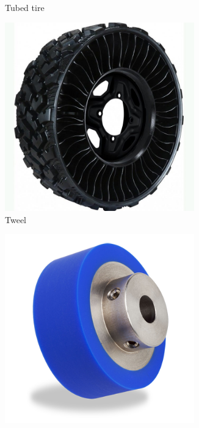 \begin{figure}[H]
\begin{subfigure}[b]{.19\linewidth}
			\caption{Tubed tire}
		\end{subfigure}\begin{subfigure}[b]{.19\linewidth}
			\includegraphics[width=0.9\textwidth]{imgs/tweel.jpeg}
			\caption{Tweel}
		\end{subfigure}\begin{subfigure}[b]{.19\linewidth}
			\includegraphics[width=0.9\textwidth]{imgs/wheel_fairlane.png}

\end{subfigure}
\end{figure}
